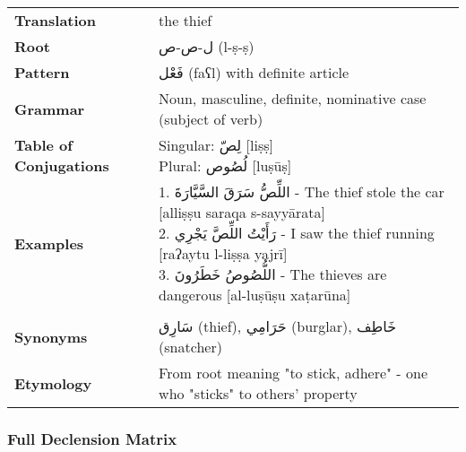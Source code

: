 \documentclass[letterpaper,12pt]{article}
\begin{document}
\begin{tabular}{p{3cm}p{10cm}}
\toprule
\textbf{Translation} & the thief \\
\textbf{Root} & \textarabic{ل-ص-ص} (l-ṣ-ṣ) \\
\textbf{Pattern} & \textarabic{فَعْل} (faʕl) with definite article \\
\textbf{Grammar} & Noun, masculine, definite, nominative case (subject of verb) \\
\textbf{Table of Conjugations} & \makecell[l]{
Singular: \textarabic{لِصّ} [liṣṣ]\\
Plural: \textarabic{لُصُوص} [luṣūṣ]
} \\
\textbf{Examples} & \makecell[l]{\parbox{9.5cm}{
1. \textarabic{اللِّصُّ سَرَقَ السَّيَّارَةَ} - The thief stole the car [alliṣṣu saraqa s-sayyārata]\\
2. \textarabic{رَأَيْتُ اللِّصَّ يَجْرِي} - I saw the thief running [raʔaytu l-liṣṣa yajrī]\\
3. \textarabic{اللُّصُوصُ خَطَرُونَ} - The thieves are dangerous [al-luṣūṣu xaṭarūna]
}} \\
\midrule \\
\textbf{Synonyms} & \textarabic{سَارِق} (thief), \textarabic{حَرَامِي} (burglar), \textarabic{خَاطِف} (snatcher) \\
\textbf{Etymology} & From root meaning "to stick, adhere" - one who "sticks" to others' property \\
\bottomrule
\end{tabular}

\subsubsection*{Full Declension Matrix}
\end{document}
